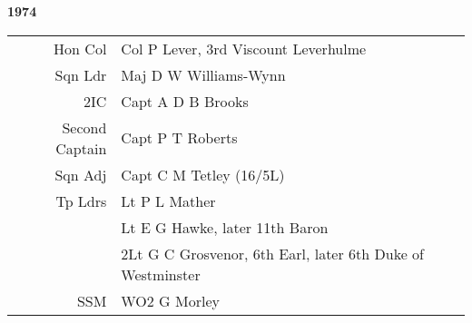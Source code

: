 \begin{center}
  \Huge
  \textbf{1974}
\end{center}

\begin{center}
  \small
  \begin{tabular}{rl}
    Hon Col & Col P Lever, 3rd Viscount Leverhulme \\
    Sqn Ldr & Maj D W Williams-Wynn \\
    2IC & Capt A D B Brooks \\
    Second Captain & Capt P T Roberts \\
    Sqn Adj & Capt C M Tetley (16/5L) \\
    Tp Ldrs & Lt P L Mather \\
      & Lt E G Hawke, later 11th Baron \\
      & 2Lt G C Grosvenor, 6th Earl, later 6th Duke of Westminster \\
    SSM & WO2 G Morley
  \end{tabular}
\end{center}

